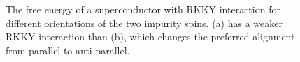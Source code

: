 \begin{figure}[H]
    \centering
    \caption{The free energy of a superconductor with RKKY interaction for different orientations of the two impurity spins. (a) has a weaker RKKY interaction than (b), which changes the preferred alignment from parallel to anti-parallel.}
    \label{fig:spin_SConly}
\end{figure}


